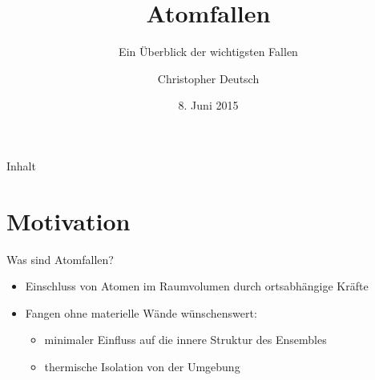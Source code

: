 \documentclass[12pt,xcolor=dvipsnames]{beamer}
\author[Christopher Deutsch]
{Christopher Deutsch}
\title
{Atomfallen}
\subtitle
{Ein Überblick der wichtigsten Fallen}
\institute[]
{Rheinische Friedrich-Wilhelms-Universität Bonn \\
Proseminar Präsentationstechnik SS15}
\date{8. Juni 2015}
\begin{document}
\maketitle

\begin{frame}{Inhalt}
	\tableofcontents
\end{frame}


\section{Motivation}

\begin{frame}{Was sind Atomfallen?}
	\begin{itemize}
		\item Einschluss von Atomen im Raumvolumen durch ortsabhängige Kräfte
		
		\item Fangen ohne materielle Wände wünschenswert:
		\begin{itemize}
			\item minimaler Einfluss auf die innere Struktur des Ensembles
			
			\item thermische Isolation von der Umgebung
		\end{itemize}

	\end{itemize}
\end{frame}
\end{document}
